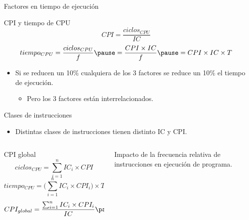 \begin{frame}[t]{Factores en tiempo de ejecución}
\begin{block}{CPI y tiempo de CPU}
\begin{displaymath}
CPI=\frac{ciclos_{CPU}}{IC}
\end{displaymath}
\pause
\begin{displaymath}
tiempo_{CPU}=
\frac{ciclos_{CPU}}{f} \pause =
\frac{CPI \times IC}{f} \pause =
CPI \times IC \times T
\end{displaymath}
\end{block}
\begin{itemize}
  \item Si se reducen un 10\% cualquiera de los 3 factores 
        se reduce un 10\% el tiempo de ejecución.
    \begin{itemize}
      \item \alert{Pero los 3 factores están interrelacionados}.
    \end{itemize}
\end{itemize}
\end{frame}

\begin{frame}[t]{Clases de instrucciones}
\begin{itemize}
  \item Distintas clases de instrucciones tienen distinto IC y CPI.
\end{itemize}
\begin{columns}
\begin{column}{.7\textwidth}
\begin{block}{CPI global}
\begin{displaymath}
ciclos_{CPU}=\sum_{i=1}^n IC_i \times CPI
\end{displaymath}
\pause
\begin{displaymath}
tiempo_{CPU} =
\big( \sum_{i=1}^n IC_i \times CPI_i \big) \times T
\end{displaymath}
\pause
\begin{displaymath}
CPI_{global} = 
\frac
{\sum_{i=1}^n IC_i \times CPI_i}
{IC}
\pause =
\sum_{i=1}^n \frac{IC_i}{IC} \times CPI_i
\end{displaymath}
\end{block}
\end{column}
\begin{column}{.3\textwidth}
\pause
\alert{Impacto de la frecuencia relativa de instrucciones en ejecución de programa.}
\end{column}
\end{columns}
\end{frame}

